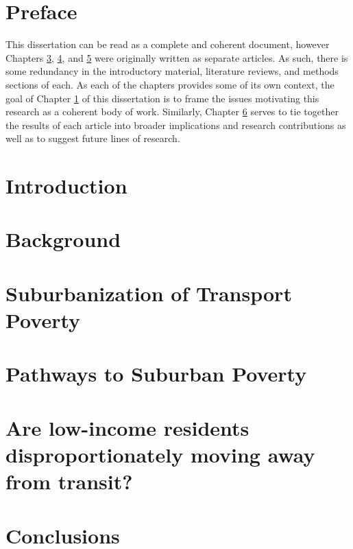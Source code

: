 \documentclass[11 pt, letterpaper]{report}
\begin{document}
\newpage


\chapter*{Preface}


This dissertation can be read as a complete and coherent document, however Chapters \ref{ch:subtrapov}, \ref{ch:pathsubpov}, and \ref{ch:lowinctra} were originally written as separate articles. As such, there is some redundancy in the introductory material, literature reviews, and methods sections of each. As each of the chapters provides some of its own context, the goal of Chapter \ref{ch:intro} of this dissertation is to frame the issues motivating this research as a coherent body of work. Similarly, Chapter \ref{ch:conc} serves to tie together the results of each article into broader implications and research contributions as well as to suggest future lines of research. 



\newpage


\renewcommand{\thepage}{\arabic{page}}%
\setcounter{page}{1}



\chapter{{Introduction}}


\label{ch:intro}



\chapter{Background}
\label{ch:background}




\chapter{Suburbanization of Transport Poverty}
\label{ch:subtrapov}




\chapter{Pathways to Suburban Poverty}
\label{ch:pathsubpov}




\chapter{Are low-income residents disproportionately moving away from transit?}
\label{ch:lowinctra}




\chapter{Conclusions}
\label{ch:conc}








\end{document}
